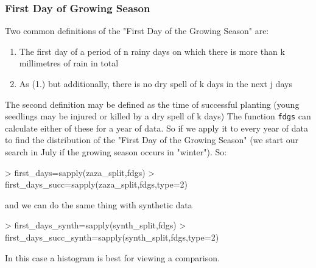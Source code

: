 \documentclass{article}
\begin{document}
\subsubsection{First Day of Growing Season}

Two common definitions of the "First Day of the Growing Season" are:

\begin{enumerate}
\item  The first day of a period of n rainy days on which there is more than k
millimetres of rain in total
\item  As (1.) but additionally, there is no dry spell of k days in the next
j days
\end{enumerate}

The second definition may be defined as the time of successful planting
(young seedlings may be injured or killed by a dry spell of k days)
The function {\tt fdgs} can calculate either of these for a year
of data.  So if we apply it to every year of data to find the distribution
of the "First Day of the Growing Season"  (we start our search in July
if the growing season occurs in "winter").  So:

\begin{Schunk}
\begin{Sinput}
> first_days=sapply(zaza_split,fdgs)
> first_days_succ=sapply(zaza_split,fdgs,type=2)
\end{Sinput}
\end{Schunk}

and we can do the same thing with synthetic data

\begin{Schunk}
\begin{Sinput}
> first_days_synth=sapply(synth_split,fdgs)
> first_days_succ_synth=sapply(synth_split,fdgs,type=2)
\end{Sinput}
\end{Schunk}

In this case a histogram is best for viewing a comparison.
\end{document}
